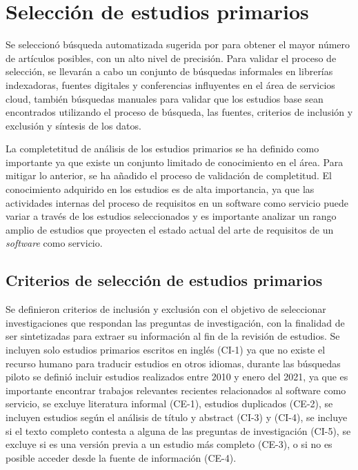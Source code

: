 \documentclass{article}
\begin{document}
\section{Selección de estudios primarios}
Se seleccionó búsqueda automatizada sugerida por \cite{kitchenham2007guidelines} para obtener el mayor número de 
artículos posibles, con un alto nivel de precisión.
Para validar el proceso de selección, se llevarán a cabo un conjunto de búsquedas 
informales en librerías indexadoras, fuentes digitales y conferencias influyentes en el área de 
servicios cloud, también búsquedas manuales para validar que los estudios base sean encontrados utilizando
el proceso de búsqueda, las fuentes, criterios de inclusión y exclusión y síntesis de los datos.

La completetitud de análisis de los estudios primarios se ha definido como importante ya que 
existe un conjunto limitado de conocimiento en el área. Para mitigar lo anterior, se ha añadido el proceso de 
validación de completitud.
El conocimiento adquirido en los estudios es de alta importancia, ya que las actividades 
internas del proceso de requisitos en un software como servicio puede variar a través de los estudios
seleccionados y es importante analizar un rango amplio de estudios que proyecten el estado actual del arte 
de requisitos de un \emph{software} como servicio. 

\subsection{Criterios de selección de estudios primarios}
Se definieron criterios de inclusión y exclusión con el objetivo 
de seleccionar investigaciones que respondan las preguntas de investigación, con la finalidad de ser  
sintetizadas para extraer su información al fin de la revisión de estudios.
Se incluyen solo estudios primarios escritos en inglés (CI-1) ya que no existe el
recurso humano para traducir estudios en otros idiomas, durante las búsquedas piloto 
se definió incluir estudios realizados entre 2010  y enero del 2021, ya que es importante
encontrar trabajos relevantes recientes relacionados al software como servicio, 
se excluye literatura informal (CE-1), estudios duplicados (CE-2), se incluyen 
estudios según el análisis de título y abstract (CI-3) y (CI-4),
se incluye si el texto completo contesta a alguna de las preguntas de investigación (CI-5), 
se excluye si es una versión previa a un estudio más completo (CE-3), o si no es posible acceder desde la fuente 
de información (CE-4).
\end{document}
